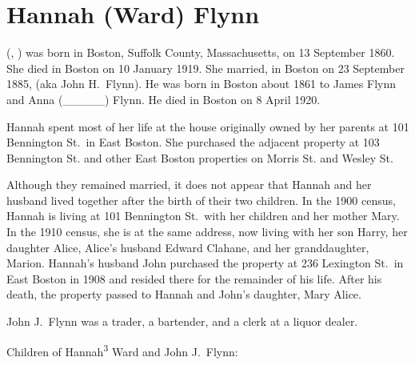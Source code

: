 \section{Hannah (Ward) Flynn}

 (, ) was born in Boston, Suffolk County, Massachusetts, on 13 September 1860.\cite{Hannah3WardBirth} She died in Boston on 10 January 1919.\cite{Hannah3WardDeath} She married, in Boston on 23 September 1885, \cite{Hannah3WardMarriage} (aka John H.\ Flynn\cite{JohnJHFlynn}). He was born in Boston about 1861 to James Flynn and Anna (\_\_\_\_\_) Flynn.\cite{Hannah3WardMarriage} He died in Boston on 8 April 1920.\cite{JohnFlynnDeath}

Hannah spent most of her life at the house originally owned by her parents at 101 Bennington St.\ in East Boston.\cite{101Bennington,Census1880DavidWard,Census1910HannahWard} She purchased the adjacent property at 103 Bennington St.\cite{103BenningtonSt} and other East Boston properties on Morris St.\cite{MorrisSt} and Wesley St.\cite{WesleySt} 

Although they remained married, it does not appear that Hannah and her husband lived together after the birth of their two children.\cite{HannahWardDirectories} In the 1900 census, Hannah is living at 101 Bennington St.\ with her children and her mother Mary.\cite{Census1900HannahWard} In the 1910 census, she is at the same address, now living with her son Harry, her daughter Alice, Alice's husband Edward Clahane, and her granddaughter, Marion.\cite{Census1910HannahWard} Hannah's husband John purchased the property at 236 Lexington St.\ in East Boston in 1908 and resided there for the remainder of his life.\cite{236Lexington,JohnFlynnDeath} After his death, the property passed to Hannah and John's daughter, Mary Alice.\cite{236Lexington2}

John J.\ Flynn was a trader,\cite{Hannah3WardMarriage} a bartender,\cite{Harry4FlynnBirth} and a clerk at a liquor dealer.\cite{JohnFlynn1889,BropheyLiquors}

\begin{KidsIntro}
	Children of Hannah\textsuperscript{3} Ward and John J.\ Flynn:
\end{KidsIntro}

